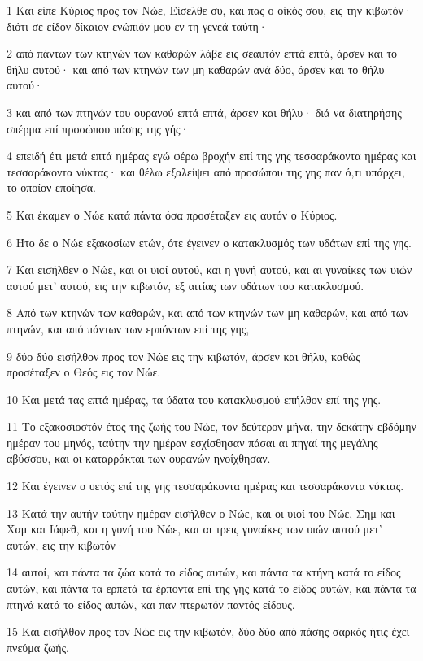 \par 1 Και είπε Κύριος προς τον Νώε, Είσελθε συ, και πας ο οίκός σου, εις την κιβωτόν· διότι σε είδον δίκαιον ενώπιόν μου εν τη γενεά ταύτη·
\par 2 από πάντων των κτηνών των καθαρών λάβε εις σεαυτόν επτά επτά, άρσεν και το θήλυ αυτού· και από των κτηνών των μη καθαρών ανά δύο, άρσεν και το θήλυ αυτού·
\par 3 και από των πτηνών του ουρανού επτά επτά, άρσεν και θήλυ· διά να διατηρήσης σπέρμα επί προσώπου πάσης της γής·
\par 4 επειδή έτι μετά επτά ημέρας εγώ φέρω βροχήν επί της γης τεσσαράκοντα ημέρας και τεσσαράκοντα νύκτας· και θέλω εξαλείψει από προσώπου της γης παν ό,τι υπάρχει, το οποίον εποίησα.
\par 5 Και έκαμεν ο Νώε κατά πάντα όσα προσέταξεν εις αυτόν ο Κύριος.
\par 6 Ήτο δε ο Νώε εξακοσίων ετών, ότε έγεινεν ο κατακλυσμός των υδάτων επί της γης.
\par 7 Και εισήλθεν ο Νώε, και οι υιοί αυτού, και η γυνή αυτού, και αι γυναίκες των υιών αυτού μετ' αυτού, εις την κιβωτόν, εξ αιτίας των υδάτων του κατακλυσμού.
\par 8 Από των κτηνών των καθαρών, και από των κτηνών των μη καθαρών, και από των πτηνών, και από πάντων των ερπόντων επί της γης,
\par 9 δύο δύο εισήλθον προς τον Νώε εις την κιβωτόν, άρσεν και θήλυ, καθώς προσέταξεν ο Θεός εις τον Νώε.
\par 10 Και μετά τας επτά ημέρας, τα ύδατα του κατακλυσμού επήλθον επί της γης.
\par 11 Το εξακοσιοστόν έτος της ζωής του Νώε, τον δεύτερον μήνα, την δεκάτην εβδόμην ημέραν του μηνός, ταύτην την ημέραν εσχίσθησαν πάσαι αι πηγαί της μεγάλης αβύσσου, και οι καταρράκται των ουρανών ηνοίχθησαν.
\par 12 Και έγεινεν ο υετός επί της γης τεσσαράκοντα ημέρας και τεσσαράκοντα νύκτας.
\par 13 Κατά την αυτήν ταύτην ημέραν εισήλθεν ο Νώε, και οι υιοί του Νώε, Σημ και Χαμ και Ιάφεθ, και η γυνή του Νώε, και αι τρεις γυναίκες των υιών αυτού μετ' αυτών, εις την κιβωτόν·
\par 14 αυτοί, και πάντα τα ζώα κατά το είδος αυτών, και πάντα τα κτήνη κατά το είδος αυτών, και πάντα τα ερπετά τα έρποντα επί της γης κατά το είδος αυτών, και πάντα τα πτηνά κατά το είδος αυτών, και παν πτερωτόν παντός είδους.
\par 15 Και εισήλθον προς τον Νώε εις την κιβωτόν, δύο δύο από πάσης σαρκός ήτις έχει πνεύμα ζωής.
